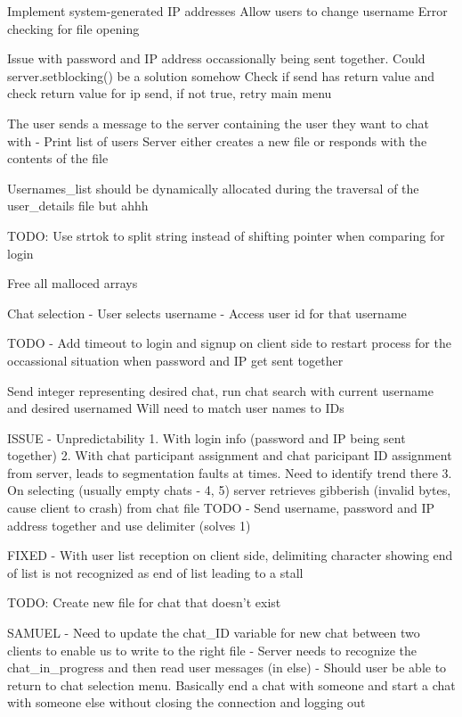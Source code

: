 Implement system-generated IP addresses
Allow users to change username
Error checking for file opening

Issue with password and IP address occassionally being sent together. 
    Could server.setblocking() be a solution somehow
    Check if send has return value and check return value for ip send, if not true, retry main menu

The user sends a message to the server containing the user they want to chat with
 - Print list of users 
Server either creates a new file or responds with the contents of the file    

Usernames_list should be dynamically allocated during the traversal of the user_details file but ahhh

TODO: Use strtok to split string instead of shifting pointer when comparing for login

Free all malloced arrays

Chat selection 
- User selects username 
- Access user id for that username

TODO - Add timeout to login and signup on client side to restart process for the occassional situation when password and IP get sent together

Send integer representing desired chat, run chat search with current username and desired usernamed
Will need to match user names to IDs 

ISSUE - Unpredictability 
1. With login info (password and IP being sent together)
2. With chat participant assignment and chat paricipant ID assignment from server, leads to segmentation faults at times. Need to identify trend there
3. On selecting (usually empty chats - 4, 5) server retrieves gibberish (invalid bytes, cause client to crash) from chat file 
TODO - Send username, password and IP address together and use delimiter (solves 1)


 FIXED - With user list reception on client side, delimiting character showing end of list is not recognized as end of list leading to a stall

TODO: Create new file for chat that doesn't exist

SAMUEL 
- Need to update the chat_ID variable for new chat between two clients to enable us to write to the right file
- Server needs to recognize the chat_in_progress and then read user messages (in else)
- Should user be able to return to chat selection menu. Basically end a chat with someone and start a chat with someone else without closing the connection and logging out
